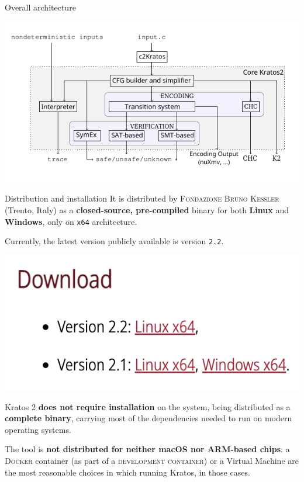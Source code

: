 \documentclass[aspectratio=1610,10.5pt]{beamer} %
\begin{document}
\begin{frame}{Overall architecture}
    \begin{center}
        \includegraphics[height=%
        0.85\textheight]{../res/architecture-paper}
    \end{center}
\end{frame}

\begin{frame}{Distribution and installation}
    It is distributed by \textsc{Fondazione Bruno Kessler} (Trento, Italy) as a \textbf{closed-source, pre-compiled} binary for both \textbf{Linux} and \textbf{Windows}, only on \texttt{x64} architecture.

    Currently, the latest version publicly available is version \texttt{2.2}.

    \begin{center}
        \includegraphics[height=%
        0.25\textheight]{../res/download-kratos}
    \end{center}

    Kratos 2 \textbf{does not require installation} on the system, being distributed as a \textbf{complete binary}, carrying most of the dependencies needed to run on modern operating systems.

    \smallskip

    The tool is \textbf{not distributed for neither macOS nor ARM-based chips}: a \textsc{Docker} container (as part of a \textsc{development container}) or a Virtual Machine are the most reasonable choices in which running Kratos, in those cases.
\end{frame}
\end{document}
